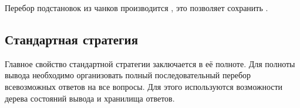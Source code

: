 Перебор подстановок из чанков производится , это позволяет сохранить .

\subsection{Стандартная стратегия }
Главное свойство стандартной стратегии  заключается в её полноте. Для полноты вывода необходимо организовать полный последовательный перебор всевозможных ответов на все вопросы. Для этого используются возможности дерева состояний вывода и хранилища ответов. 


